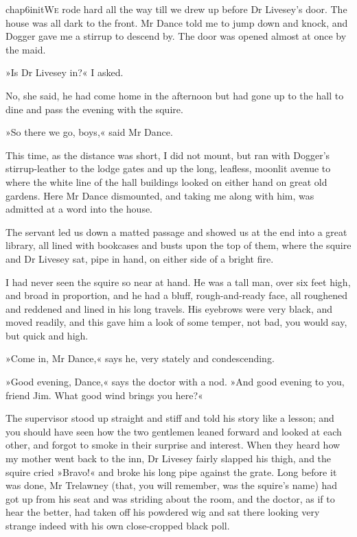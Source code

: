 

   \lettrine[lines=4,image=true]{chap6initW}{e} rode hard all the way till we drew up before Dr Livesey's door. The house was all dark to the front. Mr Dance told me to jump down and knock, and Dogger gave me a stirrup to descend by. The door was opened almost at once by the maid.

»Is Dr Livesey in?« I asked.

No, she said, he had come home in the afternoon but had gone up to the hall to dine and pass the evening with the squire.

»So there we go, boys,« said Mr Dance.

This time, as the distance was short, I did not mount, but ran with Dogger's stirrup-leather to the lodge gates and up the long, leafless, moonlit avenue to where the white line of the hall buildings looked on either hand on great old gardens. Here Mr Dance dismounted, and taking me along with him, was admitted at a word into the house.

The servant led us down a matted passage and showed us at the end into a great library, all lined with bookcases and busts upon the top of them, where the squire and Dr Livesey sat, pipe in hand, on either side of a bright fire.

I had never seen the squire so near at hand. He was a tall man, over six feet high, and broad in proportion, and he had a bluff, rough-and-ready face, all roughened and reddened and lined in his long travels. His eyebrows were very black, and moved readily, and this gave him a look of some temper, not bad, you would say, but quick and high.

»Come in, Mr Dance,« says he, very stately and condescending.

»Good evening, Dance,« says the doctor with a nod. »And good evening to you, friend Jim. What good wind brings you here?«

The supervisor stood up straight and stiff and told his story like a lesson; and you should have seen how the two gentlemen leaned forward and looked at each other, and forgot to smoke in their surprise and interest. When they heard how my mother went back to the inn, Dr Livesey fairly slapped his thigh, and the squire cried »Bravo!« and broke his long pipe against the grate. Long before it was done, Mr Trelawney (that, you will remember, was the squire's name) had got up from his seat and was striding about the room, and the doctor, as if to hear the better, had taken off his powdered wig and sat there looking very strange indeed with his own close-cropped black poll.

